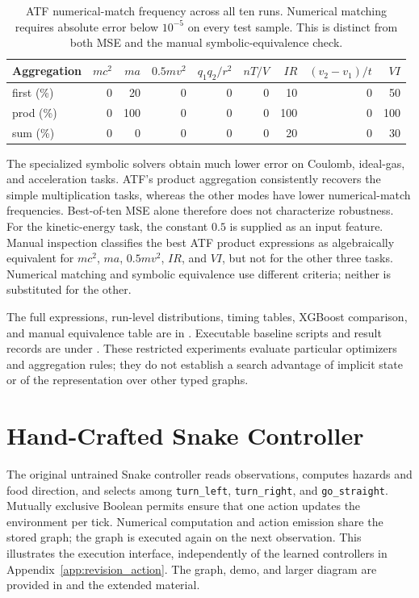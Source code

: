 \begin{table}[tb]
\centering\small
\caption{ATF numerical-match frequency across all ten runs. Numerical matching
requires absolute error below $10^{-5}$ on every test sample. This is distinct
from both MSE and the manual symbolic-equivalence check.}
\label{tab:compact_regression_success}
\begin{tabular}{lrrrrrrrr}
\toprule
Aggregation & $mc^2$ & $ma$ & $0.5mv^2$ & $q_1q_2/r^2$ & $nT/V$ & $IR$ & $(v_2-v_1)/t$ & $VI$ \\
\midrule
first (\%) & 0 & 20 & 0 & 0 & 0 & 10 & 0 & 50 \\
prod (\%) & 0 & 100 & 0 & 0 & 0 & 100 & 0 & 100 \\
sum (\%) & 0 & 0 & 0 & 0 & 0 & 20 & 0 & 30 \\
\bottomrule
\end{tabular}
\end{table}

The specialized symbolic solvers obtain much lower error on Coulomb, ideal-gas,
and acceleration tasks. ATF's product aggregation consistently recovers the
simple multiplication tasks, whereas the other modes have lower numerical-match
frequencies. Best-of-ten MSE alone therefore does not characterize robustness.
For the kinetic-energy task, the constant $0.5$ is supplied as an input feature.
Manual inspection classifies the best ATF product expressions as algebraically
equivalent for $mc^2$, $ma$, $0.5mv^2$, $IR$, and $VI$, but not for the other
three tasks. Numerical matching and symbolic equivalence use different criteria;
neither is substituted for the other.

The full expressions, run-level distributions, timing tables, XGBoost comparison,
and manual equivalence table are in . Executable
baseline scripts and result records are under
. These restricted experiments evaluate
particular optimizers and aggregation rules; they do not establish a search
advantage of implicit state or of the representation over other typed graphs.

\section{Hand-Crafted Snake Controller}
\label{app:snake_controller}
The original untrained Snake controller reads observations, computes hazards
and food direction, and selects among \texttt{turn\_left}, \texttt{turn\_right},
and \texttt{go\_straight}. Mutually exclusive Boolean permits ensure that one
action updates the environment per tick. Numerical computation and action
emission share the stored graph; the graph is executed again on the next
observation. This illustrates the execution interface, independently of the
learned controllers in Appendix~\ref{app:revision_action}. The graph, demo,
and larger diagram are provided in  and the
extended material.

